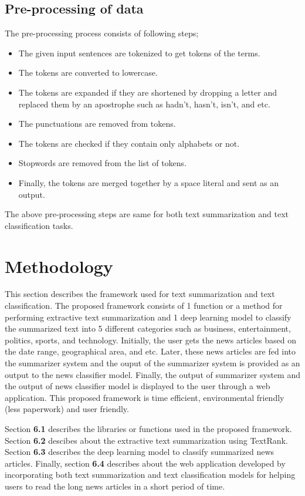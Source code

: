 \documentclass[a4paper,4pt]{article}
\begin{document}
\subsection{Pre-processing of data}
The pre-processing process consists of following steps;
\begin{itemize}
    \item  The given input sentences are tokenized to get tokens of the terms.
    \item  The tokens are converted to lowercase.
    \item  The tokens are expanded if they are shortened by dropping a letter and replaced them by an apostrophe such as hadn't,
    hasn't, isn't, and etc.
    \item  The punctuations are removed from tokens.
    \item  The tokens are checked if they contain only alphabets or not.
    \item  Stopwords are removed from the list of tokens.
    \item  Finally, the tokens are merged together by a space literal and sent as an output.
\end{itemize}
The above pre-processing steps are same for both text summarization and text classification tasks.
\section{Methodology}
This section describes the framework used for text summarization and text classification. The proposed framework consists of 
1 function or a method for performing extractive text summarization and 1 deep learning model to classify the summarized text 
into 5 different categories such as business, entertainment, politics, sports, and technology. Initially, the user gets the news
articles based on the date range, geographical area, and etc. Later, these news articles are fed into the summarizer system and 
the ouput of the summarizer system is provided as an output to the news classifier model. Finally, the output of summarizer 
system and the output of news classifier model is displayed to the user through a web application. This proposed framework is
time efficient, environmental friendly (less paperwork) and user friendly. \\
\par
Section \textbf{6.1} describes the libraries or functions used in the proposed framework. Section \textbf{6.2} descibes about the 
extractive text summarization using TextRank. Section \textbf{6.3} describes the deep learning model to classify summarized news 
articles. Finally, section \textbf{6.4} describes about the web application developed by incorporating both text summarization and 
text classification models for helping users to read the long news articles in a short period of time.
\end{document}
